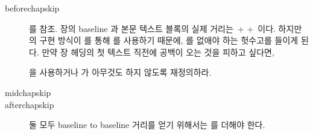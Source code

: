 \begin{description}
\item[beforechapskip] 를 참조. 
장의 baseline 과 본문 텍스트 블록의 실제 거리는 
\cmd{\beforechapskip}\,+\,\cmd{\topskip}\,+\,\cmd{\baselineskip} 이다.
하지만 \cmd{\chapter}의 구현 방식이 
\cmd{\chapterheadstart}를 통해 \cmd{\vspace*}를 사용하기 때문에,
\cmd{\beforechapskip} 를 없애야 하는 헛수고를 들이게 된다.
만약 장 헤딩의 첫 텍스트 직전에 공백이 오는 것을 피하고 싶다면,
\begin{lcode}
	\setlength\beforechapskip{-\baselineskip}
\end{lcode}
을 사용하거나 \cmd{\chapterheadstart}가 아무것도 하지 않도록 재정의하라.


\item[midchapskip] 
\item[afterchapskip] 
둘 모두 baseline to baseline 거리를 얻기 위해서는 \cmd{\baselineskip}를 더해야 한다.
\end{description}
\endgroup





